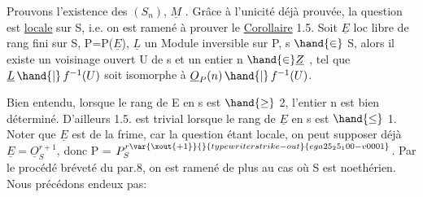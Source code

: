 
Prouvons l'existence des $(S_n)$, $\underline{M}$ . Grâce à l'unicité déjà prouvée,
la question est \uline{locale} sur S, i.e. on est ramené à prouver le
\uline{Corollaire} 1.5. Soit $\underline{E}$ loc libre de rang fini sur S, P=P($\underline{E}$), $\underline{L}$ un
Module inversible sur P, s $\hand{\in}$ S, alors il existe un voisinage ouvert U de s
et un entier n $\hand{\in} \underline{Z}$ , tel que $\underline{L}\,\hand{|}\,f^{-1}(U)$ soit isomorphe à $\underline{O}_P(n)\,\hand{|}\,f^{-1}(U)$.

\hand{\unsure{[|(}}Bien entendu, lorsque le rang de E en s est $\hand{\geq}$ 2, l'entier n est bien
déterminé. D'ailleurs 1.5. est trivial lorsque le rang de $\underline{E}$ en s est $\hand{\leq}$ 1\hand{\unsure{]|)}}.
Noter que $\underline{E}$ est de la frime, car la question étant locale, on peut supposer
déjà $\underline{E} = \underline{O}_S^{r+1}$, donc P = $P_S^{r\var{\xout{+1}}{}{typewriter strike-out}{ega25_25_100-v0001}}$\hand{\unsure{]}}. Par le procédé bréveté du par.8, on est
ramené de plus au cas où S est noethérien. Nous précédons endeux pas:

